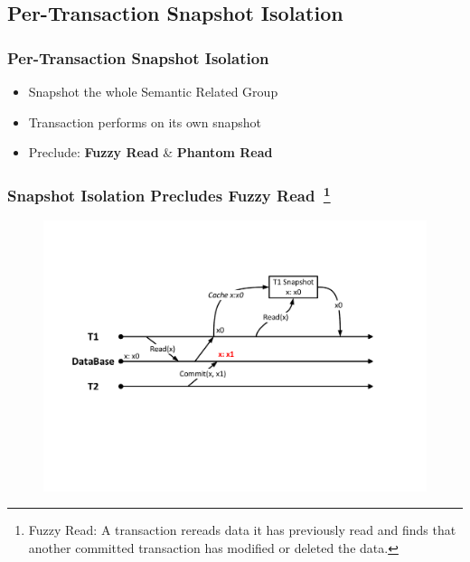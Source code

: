 \documentclass{beamer}
\begin{document}
\subsection{Per-Transaction Snapshot Isolation}
\begin{frame}
	\frametitle{Per-Transaction Snapshot Isolation}
	\begin{itemize}
		\item Snapshot the whole Semantic Related Group
		\item Transaction performs on its own snapshot
		\item Preclude: \textbf{Fuzzy Read} \& \textbf{Phantom Read}
	\end{itemize}
\end{frame}
\begin{frame}
	\frametitle{Snapshot Isolation Precludes \textbf{Fuzzy Read}~\footnote{Fuzzy Read: A transaction rereads data it has previously read and finds that another committed transaction has modified or deleted the data.}}
	\begin{figure}[!h]
		\centering
		\includegraphics[width=\linewidth]{figs/snapfuzzy.pdf}
	\end{figure}
\end{frame}
\end{document}
